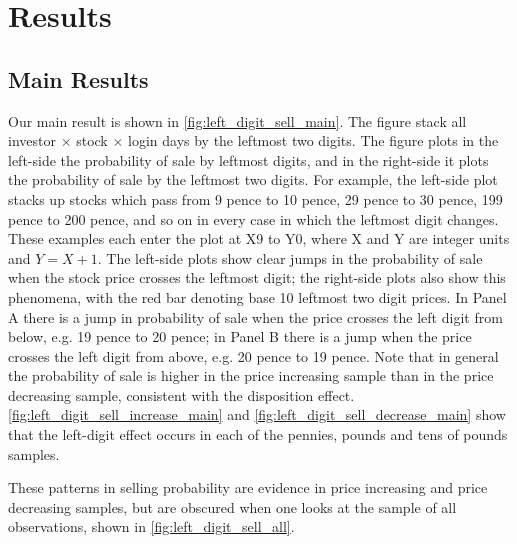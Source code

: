\section{Results}

\subsection{Main Results}

Our main result is shown in \ref{fig:left_digit_sell_main}. The figure stack all investor $\times$ stock $\times$ login days by the leftmost two digits. The figure plots in the left-side the probability of sale by leftmost digits, and in the right-side it plots the probability of sale by the leftmost two digits. For example, the left-side plot stacks up stocks which pass from 9 pence to 10 pence, 29 pence to 30 pence, 199 pence to 200 pence, and so on in every case in which the leftmost digit changes. These examples each enter the plot at X9 to Y0, where X and Y are integer units and $Y = X + 1$. The left-side plots show clear jumps in the probability of sale when the stock price crosses the leftmost digit; the right-side plots also show this phenomena, with the red bar denoting base 10 leftmost two digit prices. In Panel A there is a jump in probability of sale when the price crosses the left digit from below, e.g. 19 pence to 20 pence; in Panel B there is a jump when the price crosses the left digit from above, e.g. 20 pence to 19 pence. Note that in general the probability of sale is higher in the price increasing sample than in the price decreasing sample, consistent with the disposition effect. \ref{fig:left_digit_sell_increase_main} and \ref{fig:left_digit_sell_decrease_main} show that the left-digit effect occurs in each of the pennies, pounds and tens of pounds samples.

These patterns in selling probability are evidence in price increasing and price decreasing samples, but are obscured when one looks at the sample of all observations, shown in \ref{fig:left_digit_sell_all}. 

